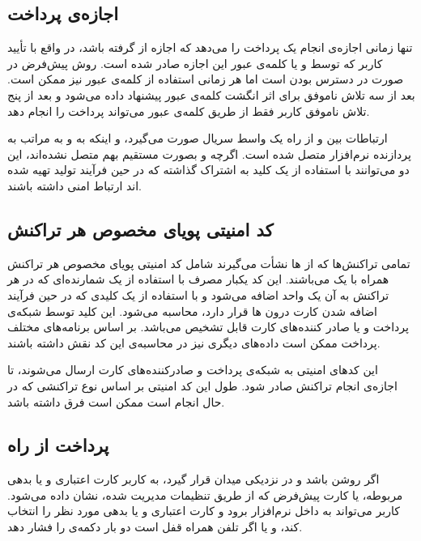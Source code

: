 \documentclass[oneside]{report}
\begin{document}
\subsection{اجازه‌ی پرداخت}

{\normalsize {}}
تنها زمانی اجازه‌ی انجام یک پرداخت را می‌دهد که اجازه از 
{\normalsize {}}
گرفته باشد، در واقع با تأیید کاربر که توسط 
{\normalsize {}} 
و یا کلمه‌ی عبور این اجازه صادر شده است. 
{\normalsize {}} 
روش پیش‌فرض در صورت در دسترس بودن است اما هر زمانی استفاده از کلمه‌ی عبور نیز ممکن است. بعد از سه تلاش ناموفق برای اثر انگشت کلمه‌ی عبور پیشنهاد داده می‌شود و بعد از پنج تلاش ناموفق کاربر فقط از طریق کلمه‌ی عبور می‌تواند پرداخت را انجام دهد. 

ارتباطات بین 
{\normalsize {}}
 و
 {\normalsize {}}
  از راه یک واسط سریال صورت می‌گیرد، و اینکه 
  {\normalsize {}} 
  به 
  {\normalsize {}}
  و به مراتب به پردازنده نرم‌افزار متصل شده است. اگرچه 
  {\normalsize {}}
  و
  {\normalsize {}}
  بصورت مستقیم بهم متصل نشده‌اند، این دو می‌توانند با استفاده‌ از یک کلید به اشتراک گذاشته که در حین فرآیند تولید تهیه شده اند ارتباط امنی داشته باشند. 
   	      				 
  \subsection{کد امنیتی پویای مخصوص هر تراکنش  } 	      			
تمامی تراکنش‌ها که از 
  {\normalsize {}} ها
  نشأت می‌گیرند شامل کد امنیتی پویای مخصوص هر تراکنش 
   همراه با یک 
     {\normalsize {}}
     می‌باشند. این کد یکبار مصرف با استفاده از یک شمارنده‌ای که در هر تراکنش به آن یک واحد اضافه می‌شود  و با استفاده از یک کلیدی که در حین فرآیند اضافه شدن کارت درون 
       {\normalsize {}}ها
       قرار دارد،   محاسبه می‌شود. این کلید توسط شبکه‌ی 	پرداخت و یا صادر کننده‌های کارت قابل تشخیص می‌باشد. بر اساس برنامه‌های مختلف پرداخت ممکن است داده‌های دیگری نیز در محاسبه‌ی این کد نقش داشته باشند. 
       
       این کدهای امنیتی به شبکه‌ی پرداخت و صادرکننده‌های کارت ارسال می‌شوند، تا اجازه‌ی انجام تراکنش صادر شود. طول این کد امنیتی بر اساس نوع تراکنشی که در حال انجام است ممکن است فرق داشته باشد. 
       
 \subsection{پرداخت از راه {\small {}} }
 اگر 
 {\normalsize {}}
 روشن باشد و در نزدیکی میدان 
 {\normalsize {}}
 قرار گیرد،  به کاربر کارت اعتباری و یا بدهی مربوطه،  یا کارت پیش‌فرض که از طریق تنظیمات مدیریت شده، نشان داده می‌شود. 
 کاربر می‌تواند به داخل نرم‌افزار 
 {\normalsize {}} 
 برود و کارت اعتباری و یا بدهی مورد نظر را انتخاب کند، و یا اگر تلفن همراه قفل است دو بار دکمه‌ی 
 {\normalsize {}} 
 را فشار دهد. 
 
\end{document}
